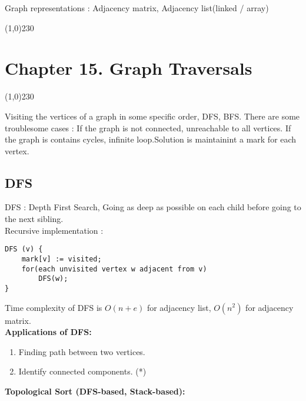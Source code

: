 \documentclass[twocolumn]{article}%
\theoremstyle{definition}
\begin{document}
\bigskip\noindent
Graph representations : Adjacency matrix, Adjacency list(linked / array)
\newpage
\begin{center}
\line(1,0){230}
\end{center}
\section*{Chapter 15. Graph Traversals}
\begin{center}
\line(1,0){230}
\end{center}
Visiting the vertices of a graph in some specific order, DFS, BFS. There are some troublesome cases : If the graph is not connected, unreachable to all vertices. If the graph is contains cycles, infinite loop.Solution is maintainint a mark for each vertex.

\subsection*{DFS}
DFS : Depth First Search, Going as deep as possible on each child before going to the next sibling.\\
Recursive implementation : 
\small{
\begin{verbatim}
DFS (v) {
    mark[v] := visited;
    for(each unvisited vertex w adjacent from v)
        DFS(w);
}
\end{verbatim}
}
\noindent
Time complexity of DFS is $O(n+e)$ for adjacency list, $O(n^2)$ for adjacency matrix.\\
\textbf{Applications of DFS: }
\begin{enumerate}
    \item Finding path between two vertices.
    \item Identify connected components. (*)
\end{enumerate}
\textbf{Topological Sort (DFS-based, Stack-based): }
\end{document}
